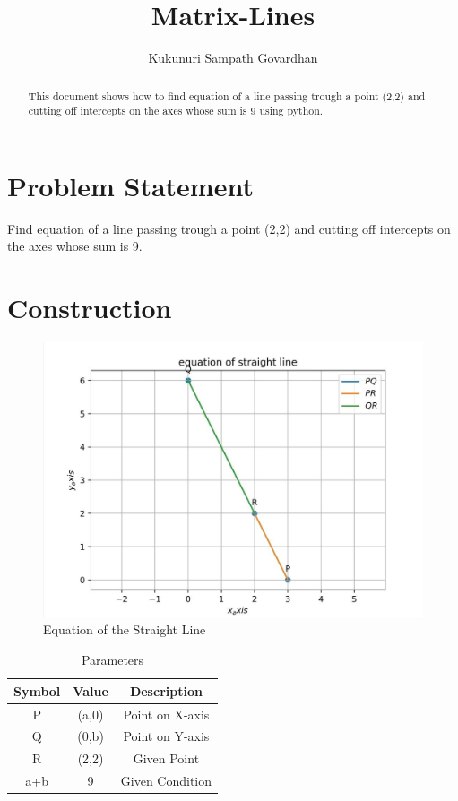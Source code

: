 \documentclass[journal,12pt,twocolumn]{IEEEtran}
\title{
Matrix-Lines
}
\author{Kukunuri Sampath Govardhan}
\begin{document}
\maketitle
\tableofcontents
\begin{abstract}
This document shows how to find equation of a line passing trough a point (2,2) and cutting off intercepts on the axes whose sum is 9 using python.
\end{abstract}
\section{Problem Statement}
Find equation of a line passing trough a point (2,2) and cutting off intercepts on the axes whose sum is 9.\\
\section{Construction}
\begin{figure}[h]
    \centering
\includegraphics[width=\columnwidth]{figs/assign4.png}
    \caption{Equation of the Straight Line}
    \label{fig:my_label}
\end{figure}

\begin{table}[h]
    \centering
    \begin{tabular}{|c|c|c|}
       \hline
       \textbf{Symbol}&\textbf{Value}&\textbf{Description}  \\
       \hline
        P & (a,0) & Point on X-axis\\
        \hline
        Q & (0,b) & Point on Y-axis\\
        \hline
        R & (2,2) & Given Point \\
        \hline
        a+b & 9 & Given Condition\\
        \hline
    \end{tabular}
    \caption{Parameters}
    \label{tab:my_label}
\end{table}
\end{document}

